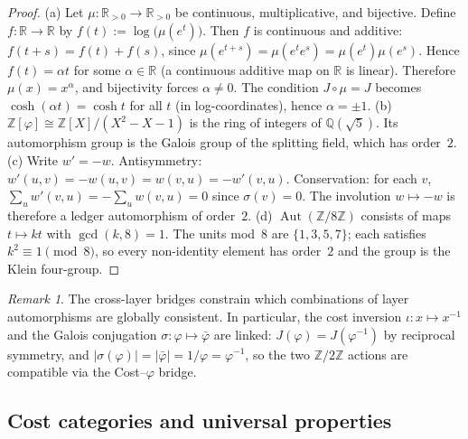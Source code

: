 \documentclass[11pt,reqno]{amsart}
\theoremstyle{plain}
\theoremstyle{definition}
\theoremstyle{remark}
\newtheorem{remark}[theorem]{Remark} %
\newcommand{\phig}{\varphi}
\newcommand{\psig}{\bar\varphi} %
\newcommand{\Jcost}{J}
\newcommand{\RR}{\mathbb{R}}
\newcommand{\ZZ}{\mathbb{Z}}
\newcommand{\conj}{\sigma} %
\newcommand{\1}{\mathbf{1}}
\newcommand{\paperadd}[1]{{\color{paperblue}#1}}
\begin{document}
\begin{proof}
(a) Let $\mu:\RR_{>0}\to\RR_{>0}$ be continuous, multiplicative, and bijective.
Define $f:\RR\to\RR$ by $f(t):=\log\bigl(\mu(e^t)\bigr)$. Then $f$ is continuous and
additive: $f(t+s)=f(t)+f(s)$, since $\mu(e^{t+s})=\mu(e^t e^s)=\mu(e^t)\mu(e^s)$.
Hence $f(t)=\alpha t$ for some $\alpha\in\RR$ (a continuous additive map on $\RR$
is linear). Therefore $\mu(x)=x^\alpha$, and bijectivity forces $\alpha\neq 0$.
The condition $\Jcost\circ\mu=\Jcost$ becomes $\cosh(\alpha t)=\cosh t$ for all $t$
(in log-coordinates), hence $\alpha=\pm1$. (b) $\ZZ[\phig]\cong\ZZ[X]/(X^2{-}X{-}1)$ is the ring of integers
of $\mathbb{Q}(\sqrt5)$. Its automorphism group is the Galois group
of the splitting field, which has order~$2$. (c) Write $w'=-w$. Antisymmetry:
$w'(u,v)=-w(u,v)=w(v,u)=-w'(v,u)$.
Conservation: for each $v$, $\sum_{u}w'(v,u)=-\sum_{u}w(v,u)=0$ since $\sigma(v)=0$. The involution $w\mapsto -w$ is therefore a ledger automorphism of order~$2$. (d) $\operatorname{Aut}(\ZZ/8\ZZ)$ consists of maps $t\mapsto kt$
with $\gcd(k,8)=1$. The units mod~$8$ are $\{1,3,5,7\}$; each
satisfies $k^2\equiv1\pmod{8}$, so every non-identity element has
order~$2$ and the group is the Klein four-group.
\end{proof} 

\begin{remark}\label{rem:aut-compat}
The cross-layer bridges constrain which combinations of layer
automorphisms are globally consistent. In particular, the cost
inversion $\iota:x\mapsto x^{-1}$ and the Galois conjugation
$\conj:\phig\mapsto\psig$ are linked:
$\Jcost(\phig)=\Jcost(\phig^{-1})$ by reciprocal symmetry, and
$|\conj(\phig)|=|\psig|=1/\phig=\phig^{-1}$, so the two
$\ZZ/2\ZZ$ actions are compatible via the Cost--$\phig$ bridge.
\end{remark} %

\subsection{\texorpdfstring{\paperadd{Cost categories and universal properties}}{Cost categories and universal properties}}\label{sec:category}
\end{document}
